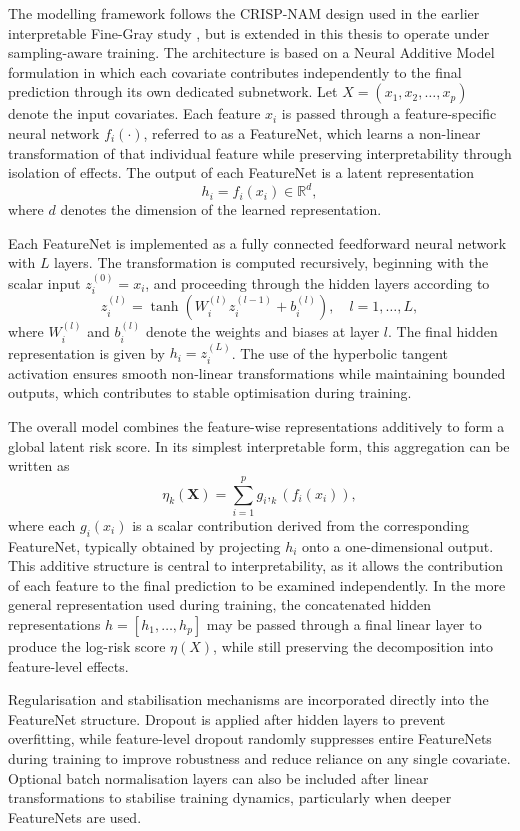 \documentclass[a4paper,twoside,12pt]{report}
\begin{document}
The modelling framework follows the CRISP-NAM design used in the earlier interpretable Fine-Gray study \cite{InterpretableFineGray2025}, but is extended in this thesis to operate under sampling-aware training. The architecture is based on a Neural Additive Model formulation in which each covariate contributes independently to the final prediction through its own dedicated subnetwork. Let $X = (x_1, x_2, \dots, x_p)$ denote the input covariates. Each feature $x_i$ is passed through a feature-specific neural network $f_i(\cdot)$, referred to as a FeatureNet, which learns a non-linear transformation of that individual feature while preserving interpretability through isolation of effects. The output of each FeatureNet is a latent representation
\[
h_i = f_i(x_i) \in \mathbb{R}^d,
\]
where $d$ denotes the dimension of the learned representation.

Each FeatureNet is implemented as a fully connected feedforward neural network with $L$ layers. The transformation is computed recursively, beginning with the scalar input $z_i^{(0)} = x_i$, and proceeding through the hidden layers according to
\[
z_i^{(l)} = \tanh\left(W_i^{(l)} z_i^{(l-1)} + b_i^{(l)}\right), \quad l = 1, \dots, L,
\]
where $W_i^{(l)}$ and $b_i^{(l)}$ denote the weights and biases at layer $l$. The final hidden representation is given by $h_i = z_i^{(L)}$. The use of the hyperbolic tangent activation ensures smooth non-linear transformations while maintaining bounded outputs, which contributes to stable optimisation during training.

The overall model combines the feature-wise representations additively to form a global latent risk score. In its simplest interpretable form, this aggregation can be written as
\[
\eta_k(\boldsymbol{X}) = \sum_{i=1}^p g_i,_k(f_i(x_i)),
\]
where each $g_i(x_i)$ is a scalar contribution derived from the corresponding FeatureNet, typically obtained by projecting $h_i$ onto a one-dimensional output. This additive structure is central to interpretability, as it allows the contribution of each feature to the final prediction to be examined independently. In the more general representation used during training, the concatenated hidden representations $h = [h_1, \dots, h_p]$ may be passed through a final linear layer to produce the log-risk score $\eta(X)$, while still preserving the decomposition into feature-level effects.

Regularisation and stabilisation mechanisms are incorporated directly into the FeatureNet structure. Dropout is applied after hidden layers to prevent overfitting, while feature-level dropout randomly suppresses entire FeatureNets during training to improve robustness and reduce reliance on any single covariate. Optional batch normalisation layers can also be included after linear transformations to stabilise training dynamics, particularly when deeper FeatureNets are used.
\end{document}

